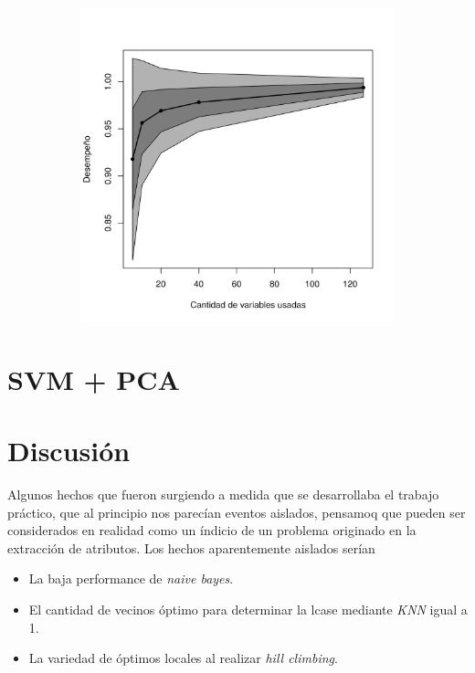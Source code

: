 \documentclass[a4paper,10pt]{article}
\begin{document}
\begin{figure}[H]
  \centering
  \begin{subfigure}[b]{0.4\textwidth}
    \includegraphics[width=\textwidth]{../imagenes/rf}
     
  \end{subfigure}
  \caption{}
  \label{fig:rf}
\end{figure}

\section{SVM + PCA}


\section{Discusi\'on}

Algunos hechos que fueron surgiendo a medida que se desarrollaba el trabajo pr\'actico, que al principio nos parec\'ian eventos aislados, pensamoq que pueden ser considerados en realidad como un \'indicio de un problema originado en la extracci\'on de atributos. Los hechos aparentemente aislados ser\'ian

\begin{itemize}
 \item La baja performance de \emph{naive bayes}. 
 \item El cantidad de vecinos \'optimo para determinar la lcase mediante \emph{KNN} igual a 1. 
 \item La variedad de \'optimos locales al realizar \emph{hill climbing}. 
\end{itemize}
\end{document}
